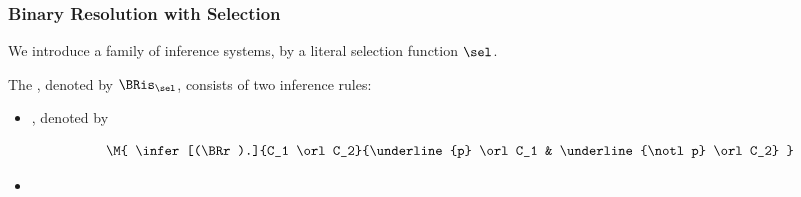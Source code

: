 
              	   \begin{frame}
           \frametitle{Binary Resolution with Selection}

We introduce a family of inference systems,  by a
literal selection function $\sel$.

The ,
denoted by \alert{$\BRis_{\sel}$}, consists of two inference rules:

\begin{itemize}
\item
  ,
  denoted by 

  \[\M{
      \infer[(\BRr).]{C_1 \orl C_2}{\underline{p} \orl C_1 & 
                                    \underline{\notl p} \orl C_2}
  }\]

\item {}
\end{itemize}

                           \end{frame}


